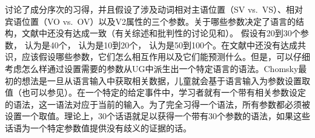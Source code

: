  \citet{GW94a}讨论了成分序次的习得，并且假设了涉及动词相对主语位置（SV vs.\ VS）、相对宾语位置（VO vs.\ OV）以及V2属性的三个参数。关于哪些参数决定了语言的结构，文献中还没有达成一致（有关综述和批判性的讨论见\citealp[\S~3.2]{Newmeyer2005a}和\citealp{Haspelmath2008a}）。 \citet[--347]{Fodor98a}假设有20到30个参数， \citet[]{GW94a}认为是40个， \citet[]{Baker2003b}认为是10到20个，  \citet[]{RH2005a}认为是50到100个。在文献中还没有达成共识，应该假设哪些参数，它们怎么相互作用以及它们能预测什么。但是，可以仔细考虑怎么样通过设置需要的参数从UG中派生出一个特定语言的语法。Chomsky最初的想法\citeyearpar[Section~3.5.1]{Chomsky86}是一旦从语言输入中获取相关数据，儿童就会基于语言输入为参数设置取值（也可以参见\citealp*{GW94a,NKN2001a}）。在一个特定的给定事件中，学习者就有一个带有相关参数设定的语法，这一语法对应于当前的输入。为了完全习得一个语法，所有参数都必须被设置一个取值。理论上，30个话语就足以获得一个带有30个参数的语法，如果这些话语为一个特定参数值提供没有歧义的证据的话。

